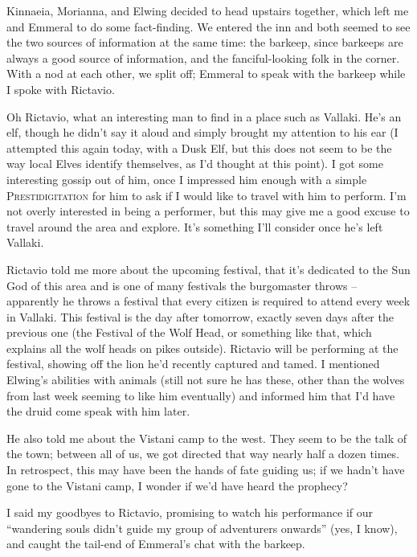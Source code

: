 Kinnaeia, Morianna, and Elwing decided to head upstairs together, which left me and Emmeral to do some fact-finding. We entered the inn and both seemed to see the two sources of information at the same time: the barkeep, since barkeeps are always a good source of information, and the fanciful-looking folk in the corner. With a nod at each other, we split off; Emmeral to speak with the barkeep while I spoke with Rictavio.

Oh Rictavio, what an interesting man to find in a place such as Vallaki. He's an elf, though he didn't say it aloud and simply brought my attention to his ear (I attempted this again today, with a Dusk Elf, but this does not seem to be the way local Elves identify themselves, as I'd thought at this point). I got some interesting gossip out of him, once I impressed him enough with a simple \textsc{Prestidigitation} for him to ask if I would like to travel with him to perform. I'm not overly interested in being a performer, but this may give me a good excuse to travel around the area and explore. It's something I'll consider once he's left Vallaki.

Rictavio told me more about the upcoming festival, that it's dedicated to the Sun God of this area and is one of many festivals the burgomaster throws -- apparently he throws a festival that every citizen is required to attend every week in Vallaki. This festival is the day after tomorrow, exactly seven days after the previous one (the Festival of the Wolf Head, or something like that, which explains all the wolf heads on pikes outside). Rictavio will be performing at the festival, showing off the lion he'd recently captured and tamed. I mentioned Elwing's abilities with animals (still not sure he has these, other than the wolves from last week seeming to like him eventually) and informed him that I'd have the druid come speak with him later.

He also told me about the Vistani camp to the west. They seem to be the talk of the town; between all of us, we got directed that way nearly half a dozen times. In retrospect, this may have been the hands of fate guiding us; if we hadn't have gone to the Vistani camp, I wonder if we'd have heard the prophecy?

I said my goodbyes to Rictavio, promising to watch his performance if our ``wandering souls didn't guide my group of adventurers onwards'' (yes, I know), and caught the tail-end of Emmeral's chat with the barkeep.

